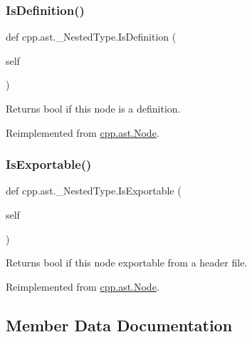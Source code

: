 \mbox{\label{classcpp_1_1ast_1_1__NestedType_a9f160999863f39c9032f60b014e213d5}} 
\subsubsection{\texorpdfstring{IsDefinition()}{IsDefinition()}}
{\footnotesize\ttfamily def cpp.\+ast.\+\_\+\+Nested\+Type.\+Is\+Definition (\begin{DoxyParamCaption}\item[{}]{self }\end{DoxyParamCaption})}

\begin{DoxyVerb}Returns bool if this node is a definition.\end{DoxyVerb}
 

Reimplemented from \mbox{\hyperlink{classcpp_1_1ast_1_1Node_a684ee9a357168e7e07a24fc6812f66e6}{cpp.\+ast.\+Node}}.

\mbox{\label{classcpp_1_1ast_1_1__NestedType_a689f8b0dc20e6070938825eee483dd2f}} 
\subsubsection{\texorpdfstring{IsExportable()}{IsExportable()}}
{\footnotesize\ttfamily def cpp.\+ast.\+\_\+\+Nested\+Type.\+Is\+Exportable (\begin{DoxyParamCaption}\item[{}]{self }\end{DoxyParamCaption})}

\begin{DoxyVerb}Returns bool if this node exportable from a header file.\end{DoxyVerb}
 

Reimplemented from \mbox{\hyperlink{classcpp_1_1ast_1_1Node_a313273874ccf578485006d4000128234}{cpp.\+ast.\+Node}}.



\subsection{Member Data Documentation}
\mbox{\label{classcpp_1_1ast_1_1__NestedType_aed69c37a409b4d26e6cfde2de3185d86}} 
